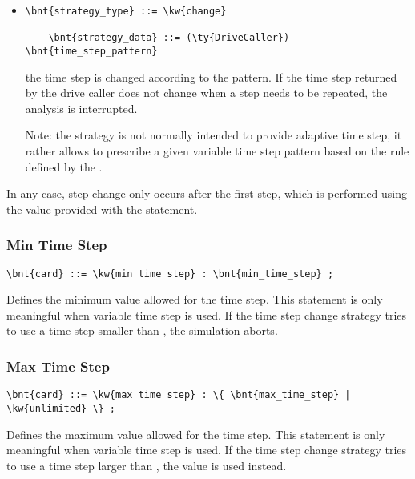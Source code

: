 \begin{itemize}
\item {}
\begin{Verbatim}[commandchars=\\\{\}]
    \bnt{strategy_type} ::= \kw{change}

    \bnt{strategy_data} ::= (\ty{DriveCaller}) \bnt{time_step_pattern}
\end{Verbatim}
the time step is changed according to the  pattern.
If the time step returned by the drive caller does not change
when a step needs to be repeated, the analysis is interrupted.

Note: the  strategy is not normally intended to provide
adaptive time step, it rather allows to prescribe a given
variable time step pattern based on the rule defined
by the  .
\end{itemize}
In any case, step change only occurs after the first step, which is performed
using the  value provided with the  statement.


\subsubsection{Min Time Step}
\begin{Verbatim}[commandchars=\\\{\}]
    \bnt{card} ::= \kw{min time step} : \bnt{min_time_step} ;
\end{Verbatim}
Defines the minimum value allowed for the time step.
This statement is only meaningful when variable time step is used.
If the time step change strategy tries to use a time step smaller
than , the simulation aborts.

\subsubsection{Max Time Step}
\begin{Verbatim}[commandchars=\\\{\}]
    \bnt{card} ::= \kw{max time step} : \{ \bnt{max_time_step} | \kw{unlimited} \} ;
\end{Verbatim}
Defines the maximum value allowed for the time step.
This statement is only meaningful when variable time step is used.
If the time step change strategy tries to use a time step larger
than , the value  is used instead.

